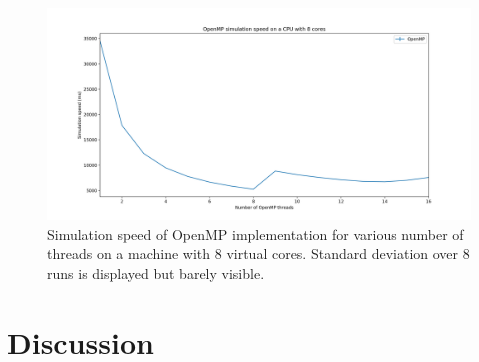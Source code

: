 \documentclass[a4paper,11pt]{scrartcl} %
\begin{document}
\begin{figure}[h!]
  \centering
  \includegraphics[width=\textwidth]{img/benchmark_omp_8_cores.png}
  \caption{Simulation speed of OpenMP implementation for various number of threads on a machine with 8 virtual cores. Standard deviation over 8 runs is displayed but barely visible.}
  \label{fig:benchmark_openmp_8}
\end{figure}

\section{Discussion}

\newpage
{}

\end{document}

